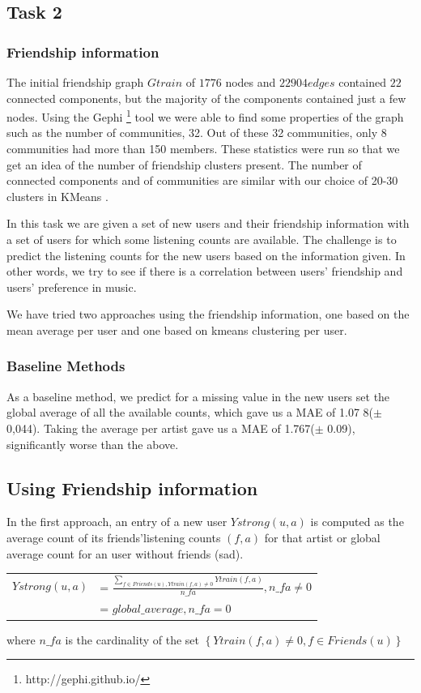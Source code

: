 \subsection{Task 2}
\subsubsection{Friendship information}
The initial friendship graph $Gtrain$ of $1776$ nodes and $22904 edges$ contained $22$ connected components, but the majority of the components contained just a few nodes.
Using the Gephi  \footnote{http://gephi.github.io/} tool we were able to find some properties of the graph such as the number of communities, 32.  Out of these 32 communities, only 8 communities had more than 150 members.
These statistics were run so that we get an idea of the number of friendship clusters present. The number of connected components and of communities are similar with our choice of 20-30 clusters in KMeans .

In this task we are given a set of new users and their friendship information with a set of users
for which some listening counts are available. The challenge is to predict the listening counts for the new users based on the information given. In other words, we try to see if there is a correlation between
users' friendship and users' preference in music.

We have tried two approaches using the friendship information, one based on the mean average per user and one based on kmeans clustering per user.

\subsubsection{Baseline Methods}
As a baseline method, we predict for a missing value in the new users set the global average of all the available counts, which gave us a MAE of 1.07 8($\pm$0,044). Taking the average per artist gave us a MAE of 1.767($\pm$  0.09), significantly worse than the above.

\subsection{Using Friendship information}
In the first approach, an entry of a new user $Ystrong(u,a)$ is computed as the average count of its friends'listening counts $(f,a)$ for that artist or global average count for an user without friends (sad).

\begin{table}[h]
  \centering
  \begin{tabular}{ c  l }
  $Ystrong(u,a) $&= $\frac{\sum_{f\in Friends(u), Ytrain(f,a)\neq0}{Ytrain(f,a)}}{n\_fa}, n\_fa \neq 0$ \\ 
                          &= $global\_average, n\_fa = 0$ \\ 
  \end{tabular}
\end{table}
where $n\_fa$ is the cardinality of the set $\left\{ Ytrain(f,a)\neq0, f\in Friends(u)\right\}$

